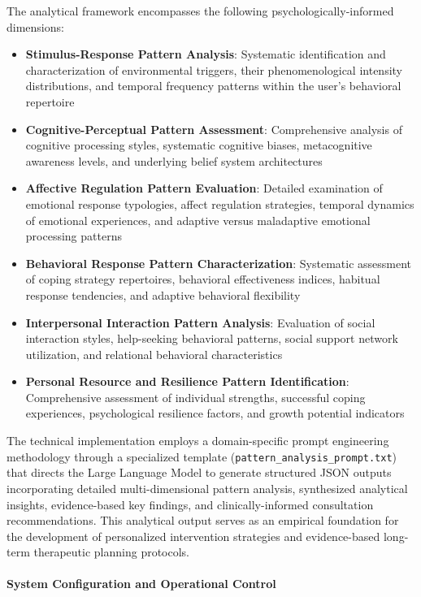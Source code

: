 The analytical framework encompasses the following psychologically-informed dimensions:

\begin{itemize}
\item \textbf{Stimulus-Response Pattern Analysis}: Systematic identification and characterization of environmental triggers, their phenomenological intensity distributions, and temporal frequency patterns within the user's behavioral repertoire
\item \textbf{Cognitive-Perceptual Pattern Assessment}: Comprehensive analysis of cognitive processing styles, systematic cognitive biases, metacognitive awareness levels, and underlying belief system architectures
\item \textbf{Affective Regulation Pattern Evaluation}: Detailed examination of emotional response typologies, affect regulation strategies, temporal dynamics of emotional experiences, and adaptive versus maladaptive emotional processing patterns
\item \textbf{Behavioral Response Pattern Characterization}: Systematic assessment of coping strategy repertoires, behavioral effectiveness indices, habitual response tendencies, and adaptive behavioral flexibility
\item \textbf{Interpersonal Interaction Pattern Analysis}: Evaluation of social interaction styles, help-seeking behavioral patterns, social support network utilization, and relational behavioral characteristics
\item \textbf{Personal Resource and Resilience Pattern Identification}: Comprehensive assessment of individual strengths, successful coping experiences, psychological resilience factors, and growth potential indicators
\end{itemize}

The technical implementation employs a domain-specific prompt engineering methodology through a specialized template (\texttt{pattern\_analysis\_prompt.txt}) that directs the Large Language Model to generate structured JSON outputs incorporating detailed multi-dimensional pattern analysis, synthesized analytical insights, evidence-based key findings, and clinically-informed consultation recommendations. This analytical output serves as an empirical foundation for the development of personalized intervention strategies and evidence-based long-term therapeutic planning protocols.


\paragraph{System Configuration and Operational Control}

